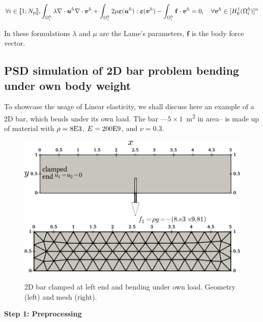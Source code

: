 \begin{equation}\label{Eq:LinearElasticity}
\forall i \in \llbracket 1; N_{\text p} \rrbracket, 
\int_{\Omega^h_i}\lambda\nabla\cdot\boldsymbol u^h\nabla\cdot\boldsymbol v^h + \int_{\Omega^h_i}2\mu\boldsymbol\varepsilon(\boldsymbol u^h):\boldsymbol\varepsilon(\boldsymbol v^h)-\int_{\Omega^h_i}\mathbf{f}\cdot\boldsymbol v^h=0, \quad\forall\boldsymbol v^h\in[H^1_0(\Omega^h_i)]^n 
\end{equation}

In these formulations $\lambda$ and $\mu$ are the Lame's parameters, $\mathbf{f}$ is the body force vector.  

\subsection{PSD simulation of 2D bar problem bending under own body weight \label{sec:2d-bar-load}}

To showcase the usage of Linear elasticity, we shall discuss here an example of a 2D bar, which bends under its own load. The bar ---$5\times1$~\si{\square\meter} in area-- is made up of material with $\rho=8\text E3$, $E=200\text E9$, and $\nu=0.3$.

\begin{figure}[htbp]
    \centering
    \includegraphics[align=t,width=.44\textwidth]{./Images/2d-bar.png}\hspace{.1\textwidth}
    \includegraphics[align=t,width=.44\textwidth]{./Images/2d-bar-mesh.png}
    \caption{2D bar clamped at left end and bending under own load. Geometry (left) and mesh (right).}
    \label{fig:2Dbar}
\end{figure} 

\textbf{Step 1: Preprocessing}


